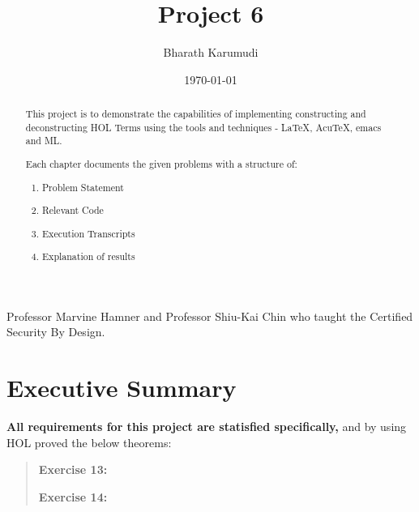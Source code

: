 \documentclass{report}
\title{Project 6}
\author{Bharath Karumudi}
\date{\today}
\begin{document}
 \lstset{language=ML}
 \maketitle{}

 \begin{abstract}
   This project is to demonstrate the capabilities of implementing
   constructing and deconstructing HOL Terms using the tools and
   techniques - \LaTeX{}, AcuTeX, emacs and ML. 

   Each chapter documents the given problems with a structure of:
   \begin{enumerate}
   \item Problem Statement
   \item Relevant Code
   \item Execution Transcripts
   \item Explanation of results
   \end{enumerate}

 \end{abstract}


 \begin{acknowledgments}
  Professor Marvine Hamner and Professor Shiu-Kai Chin who taught the
  Certified Security By Design.
 \end{acknowledgments}

 \tableofcontents{}

 \chapter{Executive Summary}
 \label{cha:executive-summary}

\textbf{All requirements for this project are statisfied specifically,}
 and by using HOL proved the below theorems:
\begin{quote}
\textbf{Exercise 13:}
\HOLsolutionsOneTheoremsaclExerciseOne
\HOLsolutionsOneTheoremsaclExerciseOneA
\HOLsolutionsOneTheoremsaclExerciseOneB

\HOLsolutionsOneTheoremsaclExerciseTwo
\HOLsolutionsOneTheoremsaclExerciseTwoA
\HOLsolutionsOneTheoremsaclExerciseTwoB

\textbf{Exercise 14:}
\HOLconopsZeroSolutionDatatypescommands
\HOLconopsZeroSolutionTheoremsOpRuleLaunchXXthm
\HOLconopsZeroSolutionTheoremsOpRuleAbortXXthm
\HOLconopsZeroSolutionTheoremsApRuleActivateXXthm
\HOLconopsZeroSolutionTheoremsApRuleStandDownXXthm

\end{quote}
\end{document}
